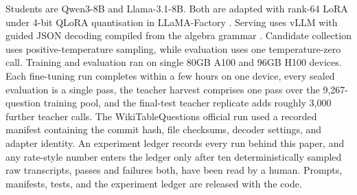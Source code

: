 \documentclass{article}
\begin{document}
Students are Qwen3-8B \citep{qwen3-2025} and Llama-3.1-8B. Both are adapted
with rank-64 LoRA under 4-bit QLoRA quantisation in LLaMA-Factory
\citep{hu2022lora,dettmers2023qlora,zheng2024llamafactory}. Serving uses vLLM
with guided JSON decoding compiled from the algebra grammar
\citep{kwon2023vllm}. Candidate collection uses positive-temperature sampling,
while evaluation uses one temperature-zero call. Training and evaluation ran
on single 80GB A100 and 96GB H100 devices. Each fine-tuning run completes
within a few hours on one device, every sealed evaluation is a single pass,
the teacher harvest comprises one pass over the 9{,}267-question training
pool, and the final-test teacher replicate adds roughly 3{,}000 further
teacher calls. The WikiTableQuestions official run
used a recorded manifest containing the commit hash, file checksums, decoder
settings, and adapter identity. An experiment ledger records every run behind
this paper, and any rate-style number enters the ledger only after ten
deterministically sampled raw transcripts, passes and failures both, have
been read by a human. Prompts, manifests, tests, and the experiment
ledger are released with the code.
\end{document}
